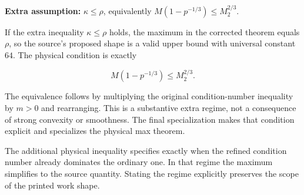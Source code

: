 \documentclass[11pt,a4paper]{article}
\begin{document}
\textbf{Extra assumption:} \(\kappa\le\rho\), equivalently \(M(1-p^{-1/3})\le M_2^{2/3}\).



If the extra inequality \(\kappa\le\rho\) holds, the maximum in the corrected theorem equals \(\rho\), so the source's proposed shape is a valid upper bound with universal constant \(64\). The physical condition is exactly

\[M(1-p^{-1/3})\le M_2^{2/3}.\]

The equivalence follows by multiplying the original condition-number inequality by \(m>0\) and rearranging. This is a substantive extra regime, not a consequence of strong convexity or smoothness. The final specialization makes that condition explicit and specializes the physical max theorem.



The additional physical inequality specifies exactly when the refined condition number already dominates the ordinary one. In that regime the maximum simplifies to the source quantity. Stating the regime explicitly preserves the scope of the printed work shape.
\end{document}

